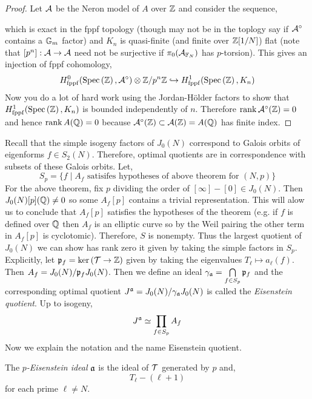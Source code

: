 \documentclass[12pt]{article}
\begin{document}
\begin{proof}
Let $\mathcal{A}$ be the Neron model of $A$ over $\mathbb{Z}$ and consider the sequence,
\begin{center}
\end{center}
which is exact in the fppf topology (though may not be in the \etale toplogy say if $\mathcal{A}^\circ$ contains a ${\mathbb{G}_m}$ factor) and $K_n$ is quasi-finite (and finite over $\mathbb{Z}[1/N]$) flat (note that $[p^n] : \mathcal{A} \to \mathcal{A}$ need not be surjective if $\pi_0(\mathcal{A}_{\mathbb{F}_N})$ has $p$-torsion). This gives an injection of fppf cohomology,
\[ H^0_{\mathrm{fppf}}(\mathrm{Spec}\left( \mathbb{Z} \right), \mathcal{A}^\circ) \otimes \mathbb{Z} / p^n \mathbb{Z} \hookrightarrow H^1_{\mathrm{fppf}}(\mathrm{Spec}\left( \mathbb{Z} \right), K_n) \]
Now you do a lot of hard work using the Jordan-H\"{o}lder factors to show that $H^1_{\mathrm{fppf}}(\mathrm{Spec}\left( \mathbb{Z} \right), K_n)$ is bounded independently of $n$. Therefore $\operatorname{\mathrm{rank}} \mathcal{A}^\circ(\mathbb{Z}) = 0$ and hence $\operatorname{\mathrm{rank}} A(\mathbb{Q}) = 0$ because $\mathcal{A}^\circ(\mathbb{Z}) \subset \mathcal{A}(\mathbb{Z}) = A(\mathbb{Q})$ has finite index. 
\end{proof}

Recall that the simple isogeny factors of $J_0(N)$ correspond to Galois orbits of eigenforms $f \in S_2(N)$. Therefore, optimal quotients are in correspondence with subsets of these Galois orbits. Let,
\[ S_p = \{ f \mid A_f \text{ satisifes hypotheses of above theorem for } (N, p) \} \]
For the above theorem, fix $p$ dividing the order of $[\infty] - [0] \in J_0(N)$. Then $J_0(N)[p](\mathbb{Q}) \neq 0$ so some $A_f[p]$ contains a trivial representation. This will alow us to conclude that $A_f[p]$ satisfies the hypotheses of the theorem (e.g. if $f$ is defined over $\mathbb{Q}$ then $A_f$ is an elliptic curve so by the Weil pairing the other term in $A_f[p]$ is cyclotomic). Therefore, $S$ is nonempty. Thus the largest quotient of $J_0(N)$ we can show has rank zero it given by taking the simple factors in $S_p$. Explicitly, let $\mathfrak{p}_f = \ker{(\mathcal{T}\to \mathbb{Z})}$ given by taking the eigenvalues $T_\ell \mapsto a_\ell(f)$. Then $A_f = J_0(N)/ \mathfrak{p}_f J_0(N)$. Then we define an ideal $\gamma_{\mathfrak{a}} = \bigcap\limits_{f \in S_p} \mathfrak{p}_f$ and the corresponding optimal quotient $J^{\mathfrak{a}} = J_0(N) / \gamma_{\mathfrak{a}} J_0(N)$ is called the \textit{Eisenstein quotient}. Up to isogeny,
\[ J^{\mathfrak{a}} \simeq \prod_{f \in S_p} A_f \]
Now we explain the notation and the name Eisenstein quotient. 

\begin{defn}
The \textit{$p$-Eisenstein ideal} $\mathfrak{a}$ is the ideal of $\mathcal{T}$ generated by $p$ and,
\[ T_\ell - (\ell + 1) \]
for each prime $\ell \neq N$.
\end{defn}
\end{document}
